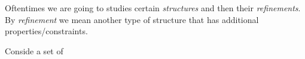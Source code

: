 

\label{ch:monoids}

Oftentimes we are going to studies certain \emph{structures} and then their \emph{refinements}.
By \emph{refinement} we mean another type of structure that has additional properties/constraints.

Conside a set of








%




